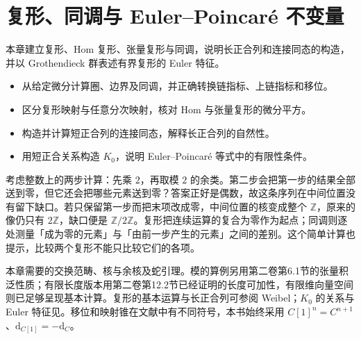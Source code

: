 
\chapter{复形、同调与 Euler–Poincaré 不变量}
\label{b4:ch:05}

\begin{chapterabstract}
本章建立复形、Hom 复形、张量复形与同调，说明长正合列和连接同态的构造，并以 Grothendieck 群表述有界复形的 Euler 特征。
\end{chapterabstract}

\begin{learninggoals}
\begin{itemize}
\item 从给定微分计算圈、边界及同调，并正确转换链指标、上链指标和移位。
\item 区分复形映射与任意分次映射，核对 Hom 与张量复形的微分平方。
\item 构造并计算短正合列的连接同态，解释长正合列的自然性。
\item 用短正合关系构造 \(K_0\)，说明 Euler–Poincaré 等式中的有限性条件。
\end{itemize}
\end{learninggoals}

考虑整数上的两步计算：先乘 \(2\)，再取模 \(2\) 的余类。第二步会把第一步的结果全部送到零，但它还会把哪些元素送到零？答案正好是偶数，故这条序列在中间位置没有留下缺口。若只保留第一步而把末项改成零，中间位置的核变成整个 \(\mathbb Z\)，原来的像仍只有 \(2\mathbb Z\)，缺口便是 \(\mathbb Z/2\mathbb Z\)。复形把连续运算的复合为零作为起点；同调则逐处测量「成为零的元素」与「由前一步产生的元素」之间的差别。这个简单计算也提示，比较两个复形不能只比较它们的各项。

\ProseParagraphBreak
本章需要的交换范畴、核与余核及蛇引理。模的算例另用第二卷第6.1节的张量积泛性质；有限长度版本用第二卷第12.2节已经证明的长度可加性，有限维向量空间则已足够呈现基本计算。复形的基本运算与长正合列可参阅 Weibel\cite[Sections 1.1--1.3, Theorem 1.3.1, Addendum 1.3.3, Proposition 1.3.4]{Weibel1994HomologicalAlgebra}；\(K_0\) 的关系与 Euler 特征见\cite[Chapter II, Definition 6.1.1, Proposition 6.6]{Weibel2013KBook}。移位和映射锥在文献中有不同符号，本书始终采用 \(C[1]^n=C^{n+1}\)、\(\mathrm{d}_{C[1]}=-\mathrm{d}_C\)。







